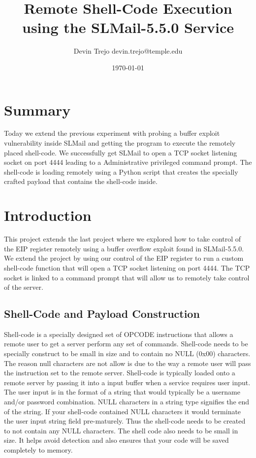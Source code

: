 \documentclass[12pt]{article}
\begin{document}
\title{Remote Shell-Code Execution using the SLMail-5.5.0 Service}
\author{Devin Trejo \tabularnewline devin.trejo@temple.edu}
\date{\today}
\maketitle

\section{Summary}
\label{sect:summary}
Today we extend the previous experiment with probing a buffer exploit
vulnerability inside SLMail and getting the program to execute the remotely 
placed shell-code. We successfully get SLMail to open a TCP socket listening
socket on port 4444 leading to a Administrative privileged command prompt.
The shell-code is loading remotely using a Python script that creates
the specially crafted payload that contains the shell-code inside. 

\section{Introduction}
\label{sect:intro}
This project extends the last project where we explored how to take control
of the EIP register remotely using a buffer overflow exploit found in 
SLMail-5.5.0. We extend the project by using our control of the EIP register
to run a custom shell-code function that will open a TCP socket listening 
on port 4444. The TCP socket is linked to a command prompt that will allow
us to remotely take control of the server. 

\subsection{Shell-Code and Payload Construction}
\label{sec:shellcode}
Shell-code is a specially designed set of OPCODE instructions that allows
a remote user to get a server perform any set of commands. Shell-code needs
to be specially construct to be small in size and to contain no NULL (0x00)
characters. The reason null characters are not allow is due to the way 
a remote user will pass the instruction set to the remote server. Shell-code
is typically loaded onto a remote server by passing it into a input buffer
when a service requires user input. The user input is in the format of a
string that would typically be a username and/or password combination. NULL
characters in a string type signifies the end of the string. If your 
shell-code contained NULL characters it would terminate the user input string
field pre-maturely. Thus the shell-code needs to be created to not contain
any NULL characters. The shell code also needs to be small in size. It 
helps avoid detection and also ensures that your code will be saved 
completely to memory. 
\end{document}
